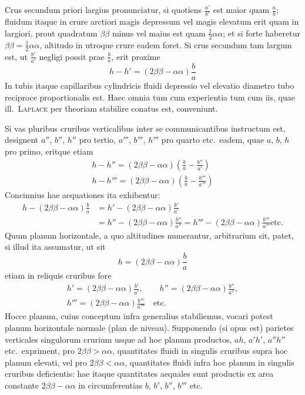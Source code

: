 Crus secundum priori largius pronunciatur, si quotiens $\frac{a'}{b'}$ est maior quam $\frac{a}{b}$; fluidum itaque in crure arctiori magis depressum vel magis elevatum erit quam in largiori, prout quadratum $\beta\beta$ minus vel maius est quam $\frac12\alpha\alpha$; et si forte haberetur $\beta\beta=\frac12\alpha\alpha$, altitudo in utroque crure eadem foret. Si crus secundum tam largum est, ut $\frac{b'}{a'}$ negligi possit prae $\frac{b}{a}$, erit proxime
\[
h-h'=(2\beta\beta-\alpha\alpha)\frac{b}{a}
\]
In tubis itaque capillaribus cylindricis fluidi depressio vel elevatio diametro tubo reciproce proportionalis est. Haec omnia tum cum experientia tum cum iis, quae ill.\ \textsc{Laplace} per theoriam stabilire conatus est, conveniunt.

Si vas pluribus cruribus verticalibus inter se communicantibus instructum est, designent $a''$, $b''$, $h''$ pro tertio, $a'''$, $b'''$, $h'''$ pro quarto etc.\ eadem, quae $a$, $b$, $h$ pro primo, eritque etiam
\[
\begin{gathered}
h-h''=(2\beta\beta-\alpha\alpha)(\frac{b}{a}-\frac{b''}{a'})\\
h-h'''=(2\beta\beta-\alpha\alpha)(\frac{b}{a}-\frac{b'''}{a'''})
\end{gathered}
\]
Concinnius hae aequationes ita exhibentur:
\[
\begin{aligned}
h-(2\beta\beta-\alpha\alpha)\frac{b}{a}&=h'-(2\beta\beta-\alpha\alpha)\frac{b'}{a'}\\
&=h''-(2\beta\beta-\alpha\alpha)\frac{b''}{a''}=h'''-(2\beta\beta-\alpha\alpha)\frac{b'''}{a'''}\text{etc.}
\end{aligned}
\]
Quum planum horizontale, a quo altitudines numerantur, arbitrarium sit, patet, si illud ita assumatur, ut sit
\[
h=(2\beta\beta-\alpha\alpha)\frac{b}{a}
\]
etiam in reliquis cruribus fore
\[
\begin{gathered}
h'=(2\beta\beta-\alpha\alpha)\frac{b'}{a'},\qquad h''=(2\beta\beta-\alpha\alpha)\frac{b''}{a''},\\
h'''=(2\beta\beta-\alpha\alpha)\frac{b'''}{a'''}\quad\text{etc.}
\end{gathered}
\]
Hocce planum, cuius conceptum infra generalius stabiliemus, vocari potest planum horizontale normale (plan de niveau). Supponendo (si opus est) parietes verticales singulorum crurium usque ad hoc planum productos, $ah$, $a'h'$, $a''h''$ etc.\ expriment, pro $2\beta\beta>\alpha\alpha$, quantitates fluidi in singulis cruribus supra hoc planum elevati, vel pro $2\beta\beta<\alpha\alpha$, quantitates fluidi infra hoc planum in singulis cruribus deficientis: hae itaque quantitates aequales sunt productis ex area constante $2\beta\beta-\alpha\alpha$ in circumferentias $b$, $b'$, $b''$, $b'''$ etc.

